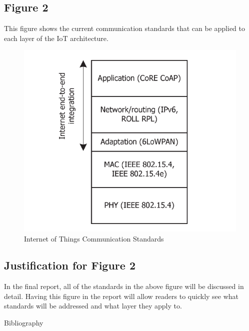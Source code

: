 \documentclass[letterpaper, 12pt]{texMemo}
\begin{document}
\begin{flushleft}
\subsection*{Figure 2}
This figure shows the current communication standards that can be applied to each layer of the IoT architecture. 

\begin{figure}[h!]
	\includegraphics[width=\linewidth]{figure3.png}
	\caption{Internet of Things Communication Standards}
	\label{fig:arch}
\end{figure}

\subsection*{Justification for Figure 2}
In the final report, all of the standards in the above figure will be discussed in detail. Having this figure in the report will allow readers to quickly see what standards
will be addressed and what layer they apply to. 

\newpage
Bibliography\\
~\newline
{}\\
~\newline
{}
\end{flushleft}
\end{document}
